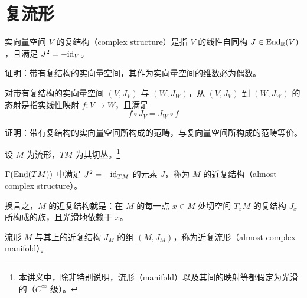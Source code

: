 \section{复流形}

\begin{definition}
实向量空间 $V$ 的复结构（complex structure）是指 $V$ 的线性自同构 $J\in\operatorname{End}_{\mathbb{R}}(V)$，且满足 $J^2=-\mathrm{id}_V$。
\end{definition}

\begin{exercise}
证明：带有复结构的实向量空间，其作为实向量空间的维数必为偶数。
\end{exercise}

\begin{definition}
对带有复结构的实向量空间 $(V,J_V)$ 与 $(W,J_W)$，从 $(V,J_V)$ 到 $(W,J_W)$ 的态射是指实线性映射 $f\colon V\to W$，且满足
\begin{equation}
    f\circ J_V = J_W\circ f \tag{1.1}
\end{equation}
\end{definition}

\begin{exercise}
证明：带有复结构的实向量空间所构成的范畴，与复向量空间所构成的范畴等价。
\end{exercise}

设 $M$ 为流形，$TM$ 为其切丛。\footnote{本讲义中，除非特别说明，流形（manifold）以及其间的映射等都假定为光滑的（$C^\infty$ 级）。}

\begin{definition}
$\Gamma(\operatorname{End}(TM))$ 中满足 $J^2=-\mathrm{id}_{TM}$ 的元素 $J$，称为 $M$ 的近复结构（almost complex structure）。
\end{definition}

换言之，$M$ 的近复结构就是：在 $M$ 的每一点 $x\in M$ 处切空间 $T_xM$ 的复结构 $J_x$ 所构成的族，且光滑地依赖于 $x$。

\begin{definition}
流形 $M$ 与其上的近复结构 $J_M$ 的组 $(M,J_M)$，称为近复流形（almost complex manifold）。
\end{definition}


